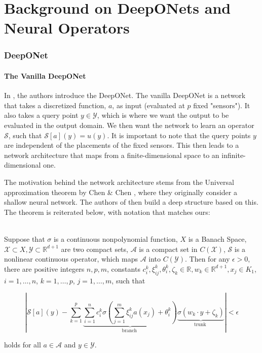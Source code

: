 \chapter{Background on DeepONets and Neural Operators}

\subsection{DeepONet}

\subsubsection{The Vanilla DeepONet}
In , the authors introduce the DeepONet. 
The vanilla DeepONet is a network that takes a discretized function, $a$, as input (evaluated at \(p\) fixed "sensors"). 
It also takes a query point $y \in \mathcal{Y}$, which is where we want the output to be evaluated in the output domain.
We then want the network to learn an operator $\mathcal{S}$, such that $\mathcal{S}[a](y) = u(y)$. 
It is important to note that the query points $y$ are independent of the placements of the fixed sensors. 
This then leads to a network architecture that maps from a finite-dimensional space to an infinite-dimensional one.

The motivation behind the network architecture stems from the Universal approximation theorem 
by Chen \& Chen , where they originally 
consider a shallow neural network. The authors of  then build a deep structure based on this. The theorem
is reiterated below, with notation that matches ours:

\begin{theorem}
    \hfill\\
    Suppose that $\sigma$ is a continuous nonpolynomial function, 
    $X$ is a Banach Space, $\mathcal{X} \subset X, \mathcal{Y} \subset \mathbb{R}^{d+1}$ are two compact sets,
    $\mathcal{A}$ is a compact set in $C\left(\mathcal{X}\right)$, $\mathcal{S}$ is a nonlinear continuous operator, 
    which maps $\mathcal{A}$ into $C\left(\mathcal{Y}\right)$. Then for any $\epsilon>0$, there are positive integers $n, p, m$, 
    constants $c_i^k, \xi_{i j}^k, \theta_i^k, \zeta_k \in \mathbb{R}, w_k \in \mathbb{R}^{d+1}, x_j \in K_1$, 
    $i=1, \ldots, n$, $k=1, \ldots, p$, $j=1, \ldots, m$, such that
    
    \begin{equation}
        \left|\mathcal{S}[a](y)-\sum_{k=1}^p 
        \underbrace{\sum_{i=1}^n c_i^k \sigma\left(\sum_{j=1}^m \xi_{i j}^k a(x_j)+\theta_i^k\right)}_{\text {branch }} 
        \underbrace{\sigma\left(w_k \cdot y+\zeta_k\right)}_{\text {trunk }}\right|<\epsilon
    \end{equation}
    
    holds for all $a \in \mathcal{A}$ and $y \in \mathcal{Y}$.
    \label{thm:universal_approximation_thm}
\end{theorem}

